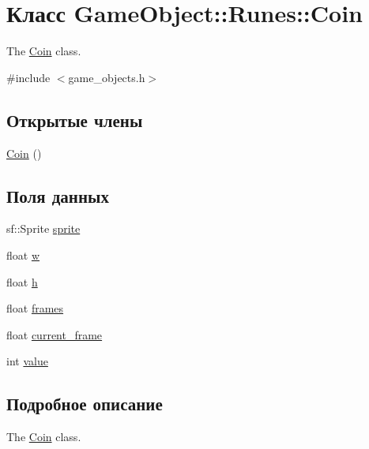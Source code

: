 \hypertarget{classGameObject_1_1Runes_1_1Coin}{}\section{Класс Game\+Object\+:\+:Runes\+:\+:Coin}
\label{classGameObject_1_1Runes_1_1Coin}


The \hyperlink{classGameObject_1_1Runes_1_1Coin}{Coin} class.  




{\ttfamily \#include $<$game\+\_\+objects.\+h$>$}

\subsection*{Открытые члены}
\begin{DoxyCompactItemize}
\item 
\hyperlink{classGameObject_1_1Runes_1_1Coin_a8250430ea5ff2903c9ef3f1655a6753c}{Coin} ()
\end{DoxyCompactItemize}
\subsection*{Поля данных}
\begin{DoxyCompactItemize}
\item 
sf\+::\+Sprite \hyperlink{classGameObject_1_1Runes_1_1Coin_a43a7a13191c5cee9de71734908e0d341}{sprite}
\item 
float \hyperlink{classGameObject_1_1Runes_1_1Coin_ace3b26447f004e704b104a473856a244}{w}
\item 
float \hyperlink{classGameObject_1_1Runes_1_1Coin_aaa1f06beaa9a8aabe7fc2d0dd9536439}{h}
\item 
float \hyperlink{classGameObject_1_1Runes_1_1Coin_a6caff0a83608e0ef628bcecae8114a07}{frames}
\item 
float \hyperlink{classGameObject_1_1Runes_1_1Coin_a6a24ef9bcca0948f9073a8f8182526bb}{current\+\_\+frame}
\item 
int \hyperlink{classGameObject_1_1Runes_1_1Coin_a58cc56a3214709645c7667d3c13d9346}{value}
\end{DoxyCompactItemize}


\subsection{Подробное описание}
The \hyperlink{classGameObject_1_1Runes_1_1Coin}{Coin} class. 

